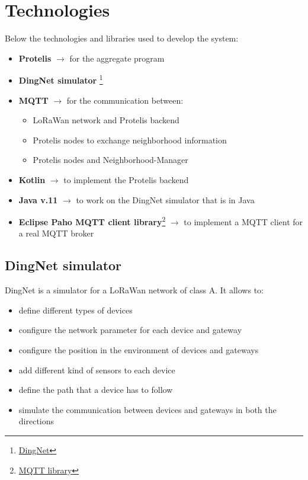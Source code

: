 \chapter{Technologies}

Below the technologies and libraries used to develop the system:

\begin{itemize}
    \item \textbf{Protelis} $\rightarrow$ for the aggregate program
    \item \textbf{DingNet simulator} \footnote{\href{https://github.com/dimoibiehg/DingNet}{DingNet}}
    \item \textbf{MQTT} $\rightarrow$ for the communication between:
    \begin{itemize}
        \item LoRaWan network and Protelis backend
        \item Protelis nodes to exchange neighborhood information
        \item Protelis nodes and Neighborhood-Manager
    \end{itemize}
    \item \textbf{Kotlin} $\rightarrow$ to implement the Protelis backend
    \item \textbf{Java v.11} $\rightarrow$ to work on the DingNet simulator that is in Java
    \item \textbf{Eclipse Paho MQTT client library}\footnote{\href{https://github.com/eclipse/paho.mqtt.java}{MQTT library}} $\rightarrow$ to implement a MQTT client for a real MQTT broker
\end{itemize}

\section{DingNet simulator}
DingNet is a simulator for a LoRaWan network of class A. It allows to:
\begin{itemize}
    \item define different types of devices
    \item configure the network parameter for each device and gateway
    \item configure the position in the environment of devices and gateways
    \item add different kind of sensors to each device 
    \item define the path that a device has to follow
    \item simulate the communication between devices and gateways in both the directions
\end{itemize}

